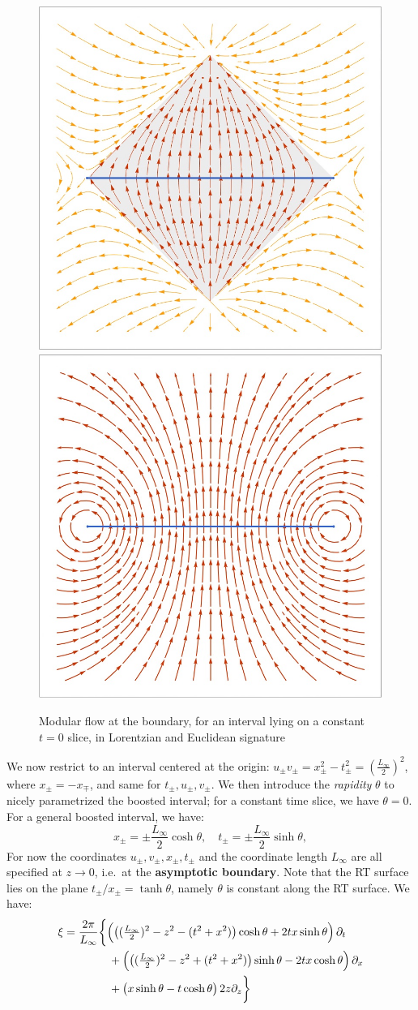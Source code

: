 \documentclass[11pt,a4paper]{article}
\begin{document}
	\begin{figure}[!ht]
	\centering
	\includegraphics[width=.4\linewidth]{img/modFlowLorentzian.png}
	\hspace{2em}
	\includegraphics[width=.4\linewidth]{img/modFlowEuclidean.png}
	\caption{Modular flow at the boundary, for an interval lying on a constant $t = 0$ slice, in Lorentzian and Euclidean signature}
	\end{figure}
	
\pagebreak[4]
	
	We now restrict to an interval centered at the origin: $
		u_\pm v_\pm
		= x^2_\pm - t^2_\pm
		= (\frac{L_\infty}{2})^2
	$, where $x_\pm = -x_\mp$, and same for $t_\pm, u_\pm, v_\pm$. 
	We then introduce the \textit{rapidity} $\theta$ to nicely parametrized the boosted interval; for a constant time slice, we have $\theta = 0$. For a general boosted interval, we have:
	\begin{equation}
		x_\pm = \pm \frac{L_\infty}{2} \cosh \theta,
	\quad
		t_\pm = \pm \frac{L_\infty}{2} \sinh \theta,
	\end{equation}
	For now the coordinates $u_\pm, v_\pm, x_\pm, t_\pm$ and the coordinate length $L_\infty$ are all specified at $z\to 0$, i.e.~at the \textbf{asymptotic boundary}. Note that the RT surface lies on the plane $
		t_\pm / x_\pm = \tanh \theta
	$, namely $\theta$ is constant along the RT surface. 
	We have:
	\begin{gather}
	\begin{aligned}
		\xi &= \frac{2\pi}{L_\infty} \bigg\{
			\pqty\Big{
				\pqty{
					(\tfrac{L_\infty}{2})^2 - z^2
					- (t^2 + x^2)
				} \cosh\theta
				+ 2tx \sinh\theta
			} \,\pdd{t}
		\\ &\qquad\qquad 
			+ \pqty\Big{
				\pqty{
					(\tfrac{L_\infty}{2})^2 - z^2
					+ (t^2 + x^2)
				} \sinh\theta
				- 2tx \cosh\theta
			} \,\pdd{x}
		\\ &\qquad\qquad 
			+ \pqty\big{
				x\sinh\theta
				- t\cosh\theta
			} \,2z\pdd{z}
		\bigg\}
	\end{aligned}
	\end{gather}
	
\end{document}
